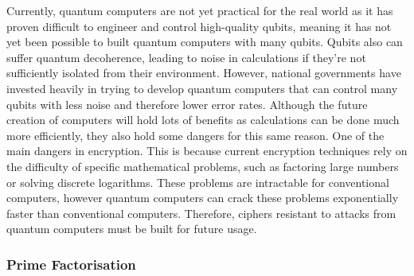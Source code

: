 \documentclass{article}
\begin{document}
   Currently, quantum computers are not yet practical for the real world as it
   has proven difficult to engineer and control high-quality qubits, meaning it
   has not yet been possible to built quantum computers with many qubits.
   Qubits also can suffer quantum decoherence, leading to noise in calculations
   if they're not sufficiently isolated from their environment. However,
   national governments have invested heavily in trying to develop quantum
   computers that can control many qubits with less noise and therefore lower
   error rates. Although the future creation of computers will hold lots of
   benefits as calculations can be done much more efficiently, they also hold
   some dangers for this same reason. One of the main dangers in encryption.
   This is because current encryption techniques rely on the difficulty of
   specific mathematical problems, such as factoring large numbers or solving
   discrete logarithms. These problems are intractable for conventional
   computers, however quantum computers can crack these problems exponentially
   faster than conventional computers. Therefore, ciphers resistant to attacks
   from quantum computers must be built for future usage.

\subsubsection{Prime Factorisation}
\end{document}
